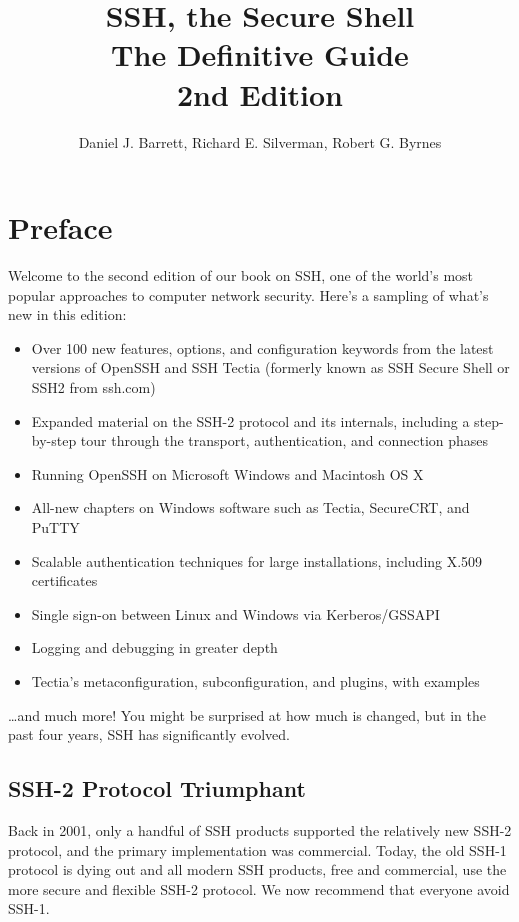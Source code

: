 \documentclass[12pt]{book}
\title{\Huge SSH, the Secure Shell\\[0.5em]
       \Large The Definitive Guide\\[0.2em]
       \Large 2nd Edition}
\author{Daniel J. Barrett, Richard E. Silverman, Robert G. Byrnes}
\date{}
\begin{document}
\maketitle

\frontmatter

\tableofcontents

\chapter{Preface}

Welcome to the second edition of our book on SSH, one of the world's most popular approaches to computer network security. Here's a sampling of what's new in this edition:

\begin{itemize}
    \item Over 100 new features, options, and configuration keywords from the latest versions of OpenSSH and SSH Tectia (formerly known as SSH Secure Shell or SSH2 from ssh.com)
    \item Expanded material on the SSH-2 protocol and its internals, including a step-by-step tour through the transport, authentication, and connection phases
    \item Running OpenSSH on Microsoft Windows and Macintosh OS X
    \item All-new chapters on Windows software such as Tectia, SecureCRT, and PuTTY
    \item Scalable authentication techniques for large installations, including X.509 certificates
    \item Single sign-on between Linux and Windows via Kerberos/GSSAPI
    \item Logging and debugging in greater depth
    \item Tectia's metaconfiguration, subconfiguration, and plugins, with examples
\end{itemize}

\ldots and much more! You might be surprised at how much is changed, but in the past four years, SSH has significantly evolved.

\section{SSH-2 Protocol Triumphant}

Back in 2001, only a handful of SSH products supported the relatively new SSH-2 protocol, and the primary implementation was commercial. Today, the old SSH-1 protocol is dying out and all modern SSH products, free and commercial, use the more secure and flexible SSH-2 protocol. We now recommend that everyone avoid SSH-1.
\end{document}

